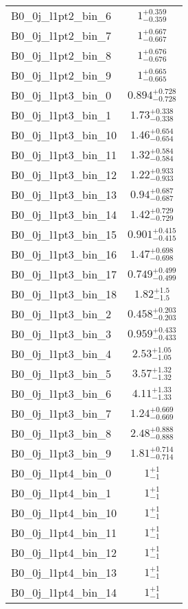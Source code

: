 \begin{tabular}{|l|c|}
B0\_0j\_l1pt2\_bin\_6 & $1^{+0.359}_{-0.359}$ \\
B0\_0j\_l1pt2\_bin\_7 & $1^{+0.667}_{-0.667}$ \\
B0\_0j\_l1pt2\_bin\_8 & $1^{+0.676}_{-0.676}$ \\
B0\_0j\_l1pt2\_bin\_9 & $1^{+0.665}_{-0.665}$ \\
B0\_0j\_l1pt3\_bin\_0 & $0.894^{+0.728}_{-0.728}$ \\
B0\_0j\_l1pt3\_bin\_1 & $1.73^{+0.338}_{-0.338}$ \\
B0\_0j\_l1pt3\_bin\_10 & $1.46^{+0.654}_{-0.654}$ \\
B0\_0j\_l1pt3\_bin\_11 & $1.32^{+0.584}_{-0.584}$ \\
B0\_0j\_l1pt3\_bin\_12 & $1.22^{+0.933}_{-0.933}$ \\
B0\_0j\_l1pt3\_bin\_13 & $0.94^{+0.687}_{-0.687}$ \\
B0\_0j\_l1pt3\_bin\_14 & $1.42^{+0.729}_{-0.729}$ \\
B0\_0j\_l1pt3\_bin\_15 & $0.901^{+0.415}_{-0.415}$ \\
B0\_0j\_l1pt3\_bin\_16 & $1.47^{+0.698}_{-0.698}$ \\
B0\_0j\_l1pt3\_bin\_17 & $0.749^{+0.499}_{-0.499}$ \\
B0\_0j\_l1pt3\_bin\_18 & $1.82^{+1.5}_{-1.5}$ \\
B0\_0j\_l1pt3\_bin\_2 & $0.458^{+0.203}_{-0.203}$ \\
B0\_0j\_l1pt3\_bin\_3 & $0.959^{+0.433}_{-0.433}$ \\
B0\_0j\_l1pt3\_bin\_4 & $2.53^{+1.05}_{-1.05}$ \\
B0\_0j\_l1pt3\_bin\_5 & $3.57^{+1.32}_{-1.32}$ \\
B0\_0j\_l1pt3\_bin\_6 & $4.11^{+1.33}_{-1.33}$ \\
B0\_0j\_l1pt3\_bin\_7 & $1.24^{+0.669}_{-0.669}$ \\
B0\_0j\_l1pt3\_bin\_8 & $2.48^{+0.888}_{-0.888}$ \\
B0\_0j\_l1pt3\_bin\_9 & $1.81^{+0.714}_{-0.714}$ \\
B0\_0j\_l1pt4\_bin\_0 & $1^{+1}_{-1}$ \\
B0\_0j\_l1pt4\_bin\_1 & $1^{+1}_{-1}$ \\
B0\_0j\_l1pt4\_bin\_10 & $1^{+1}_{-1}$ \\
B0\_0j\_l1pt4\_bin\_11 & $1^{+1}_{-1}$ \\
B0\_0j\_l1pt4\_bin\_12 & $1^{+1}_{-1}$ \\
B0\_0j\_l1pt4\_bin\_13 & $1^{+1}_{-1}$ \\
B0\_0j\_l1pt4\_bin\_14 & $1^{+1}_{-1}$ \\

\end{tabular}
